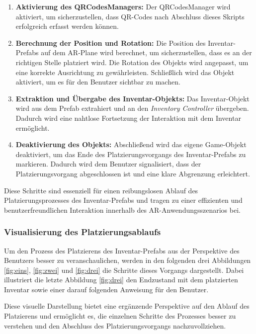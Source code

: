 \begin{enumerate}
    \item \textbf{Aktivierung des QRCodesManagers:} Der QRCodesManager wird aktiviert, um sicherzustellen, dass QR-Codes
    nach Abschluss dieses Skripts erfolgreich erfasst werden können.

    \item \textbf{Berechnung der Position und Rotation:} Die Position des Inventar-Prefabs auf dem AR-Plane wird berechnet,
    um sicherzustellen, dass es an der richtigen Stelle platziert wird. Die Rotation des Objekts wird angepasst, um eine
    korrekte Ausrichtung zu gewährleisten. Schließlich wird das Objekt aktiviert, um es für den Benutzer sichtbar zu machen.

    \item \textbf{Extraktion und Übergabe des Inventar-Objekts:} Das Inventar-Objekt wird aus dem Prefab extrahiert und
    an den \textit{Inventory Controller} übergeben. Dadurch wird eine nahtlose Fortsetzung der Interaktion mit dem Inventar
    ermöglicht.

    \item \textbf{Deaktivierung des Objekts:} Abschließend wird das eigene Game-Objekt deaktiviert, um das Ende des
    Platzierungsvorgangs des Inventar-Prefabs zu markieren. Dadurch wird dem Benutzer signalisiert, dass der Platzierungsvorgang
    abgeschlossen ist und eine klare Abgrenzung erleichtert.
\end{enumerate}

Diese Schritte sind essenziell für einen reibungslosen Ablauf des Platzierungsprozesses des Inventar-Prefabs und tragen
zu einer effizienten und benutzerfreundlichen Interaktion innerhalb des AR-Anwendungsszenarios bei.

\subsubsection{Visualisierung des Platzierungsablaufs}
Um den Prozess des Platzierens des Inventar-Prefabs aus der Perspektive des Benutzers besser zu veranschaulichen, werden
in den folgenden drei Abbildungen \ref{fig:eins}, \ref{fig:zwei} und \ref{fig:drei} die Schritte dieses Vorgangs dargestellt.
Dabei illustriert die letzte Abbildung \ref{fig:drei} den Endzustand mit dem platzierten Inventar sowie einer darauf
folgenden Anweisung für den Benutzer.

Diese visuelle Darstellung bietet eine ergänzende Perspektive auf den Ablauf des Platzierens und ermöglicht es, die einzelnen
Schritte des Prozesses besser zu verstehen und den Abschluss des Platzierungsvorgangs nachzuvollziehen.

